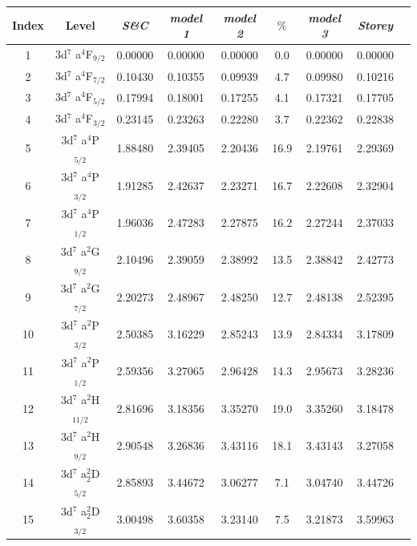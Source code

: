 %
\begin{table}[h]
\footnotesize
\begin{center}
\begin{tabular}{@{} l *8c @{}}
            \hline
\multicolumn{1}{c}{Index} & Level & \textit{S\&C} & \textit{model 1}  & \textit{model 2} & $\%$ & \textit{model 3} & \textit{Storey} \\
            \hline
\multicolumn{1}{c}{  1} & 3d$^7$ a$^4$F$_{ 9/2}$ &  0.00000  & 0.00000  & 0.00000 & 0.0 & 0.00000  & 0.00000\\
\multicolumn{1}{c}{  2} & 3d$^7$ a$^4$F$_{ 7/2}$ &  0.10430  & 0.10355  & 0.09939 & 4.7 & 0.09980    & 0.10216\\
\multicolumn{1}{c}{  3} & 3d$^7$ a$^4$F$_{ 5/2}$ &  0.17994  & 0.18001  & 0.17255 &  4.1 & 0.17321   & 0.17705\\
\multicolumn{1}{c}{  4} & 3d$^7$ a$^4$F$_{ 3/2}$ &  0.23145  & 0.23263  & 0.22280 &  3.7 & 0.22362  & 0.22838 \\
\multicolumn{1}{c}{  5} & 3d$^7$ a$^4$P$_{ 5/2}$ &  1.88480  &  2.39405  & 2.20436 &  16.9 & 2.19761   &  2.29369\\
\multicolumn{1}{c}{  6} & 3d$^7$ a$^4$P$_{ 3/2}$ &  1.91285  & 2.42637  & 2.23271 &   16.7 & 2.22608   & 2.32904\\
\multicolumn{1}{c}{  7} & 3d$^7$ a$^4$P$_{ 1/2}$ &  1.96036  & 2.47283 & 2.27875 &   16.2 & 2.27244   &   2.37033\\
\multicolumn{1}{c}{  8} & 3d$^7$ a$^2$G$_{ 9/2}$ &  2.10496  & 2.39059  & 2.38992 &  13.5 & 2.38842   & 2.42773\\
\multicolumn{1}{c}{  9} & 3d$^7$ a$^2$G$_{ 7/2}$ &  2.20273  & 2.48967  & 2.48250 &   12.7 & 2.48138 & 2.52395 \\
\multicolumn{1}{c}{ 10} & 3d$^7$ a$^2$P$_{ 3/2}$ &  2.50385   & 3.16229 &     2.85243 &   13.9 & 2.84334   & 3.17809\\
\multicolumn{1}{c}{ 11} & 3d$^7$ a$^2$P$_{ 1/2}$ &  2.59356  & 3.27065 &    2.96428 & 14.3 & 2.95673    & 3.28236 \\
\multicolumn{1}{c}{ 12} & 3d$^7$ a$^2$H$_{11/2}$ &  2.81696  & 3.18356 &    3.35270 & 19.0 & 3.35260    & 3.18478\\
\multicolumn{1}{c}{ 13} & 3d$^7$ a$^2$H$_{ 9/2}$ &  2.90548  &  3.26836 &     3.43116 &  18.1 & 3.43143  & 3.27058\\
\multicolumn{1}{c}{ 14} & 3d$^7$ a$^2_2$D$_{5/2}$ &  2.85893  & 3.44672 &    3.06277 &  7.1 & 3.04740   & 3.44726\\
\multicolumn{1}{c}{ 15} & 3d$^7$ a$^2_2$D$_{ 3/2}$ &  3.00498  & 3.60358 &    3.23140 & 7.5 & 3.21873   &  3.59963 \\

\end{tabular}
\end{center}
\end{table}
